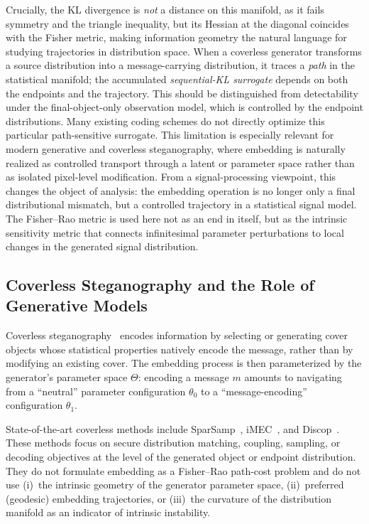 \documentclass[a4paper,fleqn]{cas-dc}
\begin{document}
Crucially, the KL divergence is \emph{not} a distance on this manifold, as it
fails symmetry and the triangle inequality, but its Hessian at the diagonal
coincides with the Fisher metric, making information geometry the natural
language for studying trajectories in distribution space.
When a coverless generator transforms a source distribution into a
message-carrying distribution, it traces a \emph{path} in the statistical
manifold; the accumulated \emph{sequential-KL surrogate} depends on both
the endpoints and the trajectory. This should be distinguished from
detectability under the final-object-only observation model, which is
controlled by the endpoint distributions. Many existing coding schemes
do not directly optimize this particular path-sensitive surrogate.
This limitation is especially relevant for modern generative and coverless
steganography, where embedding is naturally realized as controlled transport
through a latent or parameter space rather than as isolated pixel-level
modification.
From a signal-processing viewpoint, this changes the object of analysis:
the embedding operation is no longer only a final distributional mismatch, but
a controlled trajectory in a statistical signal model. The Fisher--Rao metric is
used here not as an end in itself, but as the intrinsic sensitivity metric that
connects infinitesimal parameter perturbations to local changes in the generated
signal distribution.

\subsection{Coverless Steganography and the Role of Generative Models}

Coverless steganography~\cite{luo2023coverless} encodes information by
selecting or generating cover objects whose statistical properties natively
encode the message, rather than by modifying an existing cover.
The embedding process is then parameterized by the generator's parameter
space $\Theta$: encoding a message $m$ amounts to navigating from a
``neutral'' parameter configuration $\theta_0$ to a
``message-encoding'' configuration $\theta_1$.

State-of-the-art coverless methods include SparSamp~\cite{sparsamp2021},
iMEC~\cite{imec2022}, and Discop~\cite{discop2023}.
These methods focus on secure distribution matching, coupling, sampling, or
decoding objectives at the level of the generated object or endpoint
distribution.
They do not formulate embedding as a Fisher--Rao path-cost problem and do not
use (i)~the intrinsic geometry of the generator parameter space, (ii)~preferred
(geodesic) embedding trajectories, or (iii)~the curvature of the distribution
manifold as an indicator of intrinsic instability.
\end{document}
